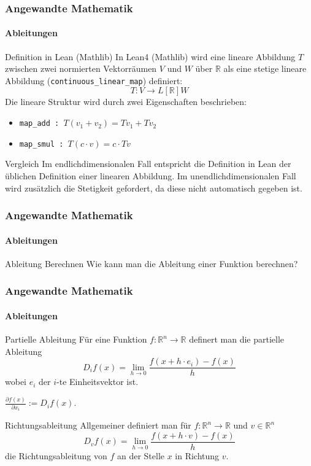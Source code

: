\documentclass{beamer}
\begin{document}
\begin{frame}
    \frametitle{Angewandte Mathematik}
    \framesubtitle{Ableitungen}

    \begin{block}{Definition in Lean (Mathlib)}
        In Lean4 (Mathlib) wird eine lineare Abbildung \( T \) zwischen zwei normierten Vektorräumen \( V \) und \( W \) über \( \mathbb{R} \) als eine stetige lineare Abbildung (\texttt{continuous\_linear\_map}) definiert:
        \[
        T : V \to L[\mathbb{R}] W
        \]
        Die lineare Struktur wird durch zwei Eigenschaften beschrieben:
        \begin{itemize}
            \item \texttt{map\_add : $T (v_1 + v_2) = T v_1 + T v_2$}
            \item \texttt{map\_smul : $T (c \cdot v) = c \cdot T v$}
        \end{itemize}
    \end{block}

    \begin{block}{Vergleich}
       Im endlichdimensionalen Fall entspricht die Definition in Lean der üblichen Definition einer linearen Abbildung. 
       Im unendlichdimensionalen Fall wird zusätzlich die Stetigkeit gefordert, da diese nicht automatisch gegeben ist.
    \end{block}
    
\end{frame}

    \begin{frame}
        \frametitle{Angewandte Mathematik}
        \framesubtitle{Ableitungen}
        \begin{block}{Ableitung Berechnen}
            Wie kann man die Ableitung einer Funktion berechnen?
        \end{block}
    
    \end{frame}




    \begin{frame}
        \frametitle{Angewandte Mathematik}
        \framesubtitle{Ableitungen}  
        \begin{block}{Partielle Ableitung}
            Für eine Funktion $f: \mathbb{R}^n \to \mathbb{R}$ definert man die partielle Ableitung 
            \[
                D_i f (x) = \lim_{h \to 0} \frac{f(x + h \cdot e_i) - f(x)}{h}
                \]
            wobei \( e_i \) der \( i \)-te Einheitsvektor ist. 
           
            \( \frac{\partial f(x)}{\partial x_i} :=  D_i f (x)\).
            
        \end{block}

        \begin{block}{Richtungsableitung}
            Allgemeiner definiert man für $f: \mathbb{R}^n \to \mathbb{R}$ und  $v \in \mathbb{R}^n$
            \[
                D_v f (x) = \lim_{h \to 0} \frac{f(x + h \cdot v) - f(x)}{h}
                \]
            die Richtungsableitung von $f$ an der Stelle $x$ in Richtung $v$.            
        \end{block}
    \end{frame}
\end{document}
